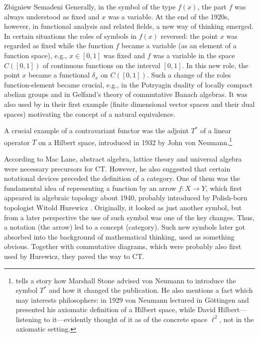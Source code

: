 \begin{artengenv}{Zbigniew Semadeni}
Generally, in the symbol of the type $f(x)$, the part $f$ was always understood 
as fixed and $x$ was a variable. At the end of the 1920s, however, in functional 
analysis and related fields, a new way of thinking emerged. In certain situations 
the roles of symbols in $f(x)$ reversed: the point $x$ was regarded as fixed while 
the function $f$ became a variable (as an element of a function space), e.g., 
$x\in [0,1]$ was fixed and $f$ was a variable in the space $C([0,1])$ of continuous 
functions on the interval $[0,1]$. In this new role, the point $x$ became a functional 
$\delta_x$ on $C([0,1])$. Such a change of the roles function-element became crucial, 
e.g., in the Potryagin duality of locally compact abelian groups \parencite{Hewitt} 
and in Gelfand’s theory of commutative Banach algebras. It was also used by \citeauthor{E-ML} 
in their first example (finite dimensional vector spaces 
and their dual spaces) motivating the concept of a natural equivalence.  

A crucial example of a contravariant functor was the adjoint $T^\ast$ of a linear 
operator $T$ on a Hilbert space, introduced in 1932 by John von Neumann.\footnote{\citeauthor[p.330]{Century} tells a story how Marshall Stone advised von Neumann to introduce the symbol $T^\ast$ and how it changed the publication. He also 
mentions a fact which may interests philosophers: in 1929 von Neumann lectured in 
G{\"o}ttingen and presented his axiomatic definition of a Hilbert space, while David 
Hilbert---listening to it---evidently thought of it as of the concrete 
space $\ell^2$, not in the axiomatic setting.} %

According to Mac Lane, abstract algebra, lattice theory and universal algebra were 
necessary precursors for CT. However, he also suggested that certain notational 
devices preceded the definition of a category. One of them was the fundamental idea 
of representing a function by an arrow $f\colon X\to Y$, which first appeared in 
algebraic topology about 1940, probably introduced by Polish-born topologist Witold 
Hurewicz \parencites[][p.29]{Working}[][p.333]{Century}. Originally, it looked as just 
another symbol, but from a later perspective the use of such symbol was one of the 
key changes. Thus, a notation (the arrow) led to a concept (category). Such new symbols 
later got absorbed into the background of mathematical thinking, used as something 
obvious. Together with commutative diagrams, which were probably also first used by 
Hurewicz, they paved the way to CT. 


\end{artengenv}
